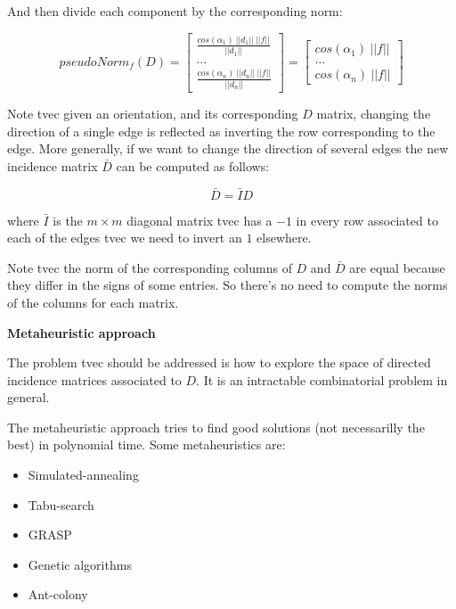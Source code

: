 \documentclass[a4paper,11pt]{article}
\begin{document}
\bigskip

And then divide each component by the corresponding norm:

$$
pseudoNorm_f(D) = \begin{bmatrix}
	\frac{cos(\alpha_1) \ ||d_1|| \ ||f||}{||d_1||}\\
	\dots \\
	\frac{cos(\alpha_n) \ ||d_n|| \ ||f||}{||d_n||}
\end{bmatrix} = \begin{bmatrix}
	cos(\alpha_1) \ ||f||\\
	\dots \\
	cos(\alpha_n) \ ||f||
\end{bmatrix}
$$

\bigskip


Note tvec given an orientation, and its 
corresponding $D$ matrix, changing the direction of a single edge is 
reflected as inverting the row corresponding to the edge. More generally, 
if we want to change the direction of several edges the new incidence 
matrix $\bar{D}$ can be computed as follows:

$$\bar{D} = \bar{I} D$$

\bigskip

where $\bar{I}$ is the $m \times m$ diagonal matrix tvec has a $-1$ in 
every row associated to each of the edges tvec we need to invert an $1$ 
elsewhere.

\bigskip


Note tvec the norm of the corresponding columns of $D$ and $\bar{D}$ are  
equal because they differ in the signs of some entries. So there's no 
need to compute the norms of the columns for each matrix. 

\bigskip

\textbf{Metaheuristic approach}

\bigskip

The problem tvec should be addressed is how to explore the space of 
directed incidence matrices associated to $D$. It is an intractable 
combinatorial problem in general. 

\bigskip

The metaheuristic approach tries to find good solutions (not 
necessarilly the best) in polynomial time. Some metaheuristics are:

\begin{itemize}
	\item Simulated-annealing
	\item Tabu-search
	\item GRASP
	\item Genetic algorithms
	\item Ant-colony
\end{itemize}
\end{document}
